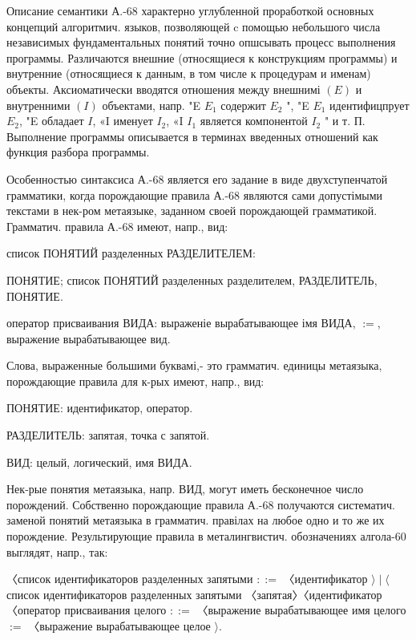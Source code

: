 \documentclass[10pt]{article}
\begin{document}
Описание семантики А.-68 характерно углубленной проработкой основных концепций алгоритмич. языков, позволяющей $\mathrm{c}$ помощью небольшого числа независимых фундаментальных понятий точно опшсывать процесс выполнения программы. Различаются внешние (относящиеся к конструкциям программы) и внутренние (относящиеся к данным, в том числе к процедурам и именам) объекты. Аксиоматически вводятся отношения между внешнимі $(E)$ и внутренними $(I)$ объектами, напр. "E $E_{1}$ содержит $E_{2}$ ", "E $E_{1}$ идентифицпрует $E_{2}$, "E обладает $I$, «I именует $I_{2}$, «I $I_{1}$ является компонентой $I_{2}$ " и т. П. Выполнение программы описывается в терминах введенных отношений как функция разбора программы.



Особенностью синтаксиса А.-68 является его задание в виде двухступенчатой грамматики, когда порождающие правила А.-68 являются сами допустімыми текстами в нек-ром метаязыке, заданном своей порождающей грамматикой. Грамматич. правила А.-68 имеют, напр., вид:



список ПОНЯТИЙ разделенных РАЗДЕЛИТЕЛЕМ:



ПОНЯТИЕ; список ПОНЯТИЙ разделенных разделителем, РАЗДЕЛИТЕЛЬ, ПОНЯТИЕ.



оператор присваивания ВИДА: выраженіе вырабатывающее імя ВИДА, $:=$, выражение вырабатывающее вид.



Слова, выраженные большими буквамі,- это грамматич. единицы метаязыка, порождающие правила для к-рых имеют, напр., вид:



ПОНЯТИЕ: идентификатор, оператор.



РАЗДЕЛИТЕЛЬ: запятая, точка с запятой.



ВИД: целый, логический, имя ВИДА.



Нек-рые понятия метаязыка, напр. ВИД, могут иметь бесконечное число порождений. Собственно порождающие правила А.-68 получаются систематич. заменой понятий метаязыка в грамматич. правілах на любое одно и то же их порождение. Результирующие правила в металингвистич. обозначениях алгола-60 выглядят, напр., так:



〈список идентификаторов разделенных запятыми $::=$ 〈идентификатор $\rangle \mid\langle$ список идентификаторов разделенных запятыми 〈запятая〉〈идентификатор 〈оператор присваивания целого $::=$ 〈выражение вырабатывающее имя целого $:=$ 〈выражение вырабатывающее целое $\rangle$.
\end{document}
